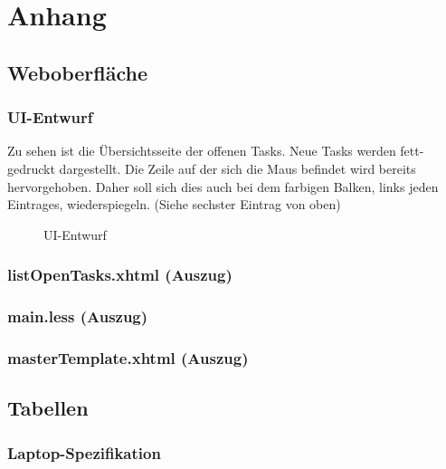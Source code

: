 \section{Anhang}


\subsection{Weboberfläche}
\label{app:Weboberfläche}

\subsubsection{UI-Entwurf}
\label{app:UI-Entwurf}
Zu sehen ist die Übersichtsseite der offenen Tasks. Neue Tasks werden fett-gedruckt dargestellt. Die Zeile auf der sich die Maus
befindet wird bereits hervorgehoben. Daher soll sich dies auch bei dem farbigen Balken, links jeden Eintrages, wiederspiegeln.
(Siehe sechster Eintrag von oben)
\begin{figure}[htb]
\centering
{}
\caption{UI-Entwurf}
\end{figure}

\subsubsection{listOpenTasks.xhtml (Auszug)}
\label{app:listOpenTasks}


\clearpage
\subsubsection{main.less (Auszug)}
\label{app:main.less}


\subsubsection{masterTemplate.xhtml (Auszug)}
\label{app:masterTemplate}



\clearpage
\subsection{Tabellen}
\label{Tabellen}

\subsubsection{Laptop-Spezifikation}
\label{app:Laptop-Spezifikation}

